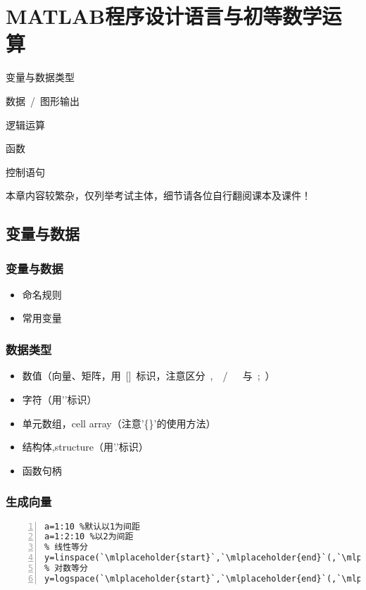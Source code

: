\chapter{MATLAB程序设计语言与初等数学运算}
\begin{introduction}
\item 变量与数据类型
\item 数据~/~图形输出
\item 逻辑运算
\item 函数
\item 控制语句
\end{introduction}

\begin{note}
本章内容较繁杂，仅列举考试主体，细节请各位自行翻阅课本及课件！
\end{note}

\section{变量与数据}
\subsection{变量与数据}
\begin{itemize}
  \item 命名规则
  \item 常用变量
\end{itemize}
\subsection{数据类型}
\begin{itemize}
  \item 数值（向量、矩阵，用~[]~标识，注意区分~,~~/~~\verb*+ +与~;~）
  \item 字符（用''标识）
  \item 单元数组，cell array（注意'\{\}'的使用方法）
  \item 结构体,structure（用'.'标识）
  \item 函数句柄
\end{itemize}
\subsection{生成向量}
\begin{lstlisting}[frame=single,numbers=left]
a=1:10 %默认以1为间距
a=1:2:10 %以2为间距
% 线性等分
y=linspace(`\mlplaceholder{start}`,`\mlplaceholder{end}`(,`\mlplaceholder{n}`))
% 对数等分
y=logspace(`\mlplaceholder{start}`,`\mlplaceholder{end}`(,`\mlplaceholder{n}`))
\end{lstlisting}
\newpage
